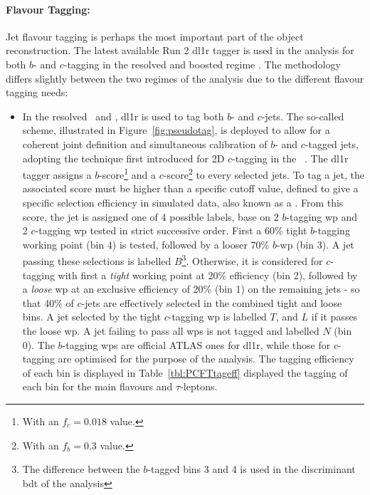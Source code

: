 \paragraph{Flavour Tagging:} Jet flavour tagging is perhaps the most important part of the object reconstruction. The latest available Run 2 \gls{dl1r} tagger is used in the analysis for both $b$- and $c$-tagging in the resolved and boosted regime \cite{atlas:FTAGRUN2}. The methodology differs slightly between the two regimes of the analysis due to the different flavour tagging needs:  %
\begin{itemize}
  \item In the resolved \vhb\ and \vhc, \gls{dl1r} is used to tag both $b$- and $c$-jets. The so-called  scheme, illustrated in Figure~\ref{fig:pseudotag}, is deployed to allow for a coherent joint definition and simultaneous calibration of $b$- and $c$-tagged jets, adopting the technique first introduced for 2D $c$-tagging in the \vhc\ \cite{Collaboration:2721696}. The \gls{dl1r} tagger assigns a $b$-score\footnote{With an $f_c = 0.018$ value.} and a $c$-score\footnote{With an $f_b = 0.3$ value.} to every selected jets. To tag a jet, the associated score must be higher than a specific cutoff value, defined to give a specific selection efficiency in simulated data, also known as a . From this score, the jet is assigned one of 4 possible labels, base on 2 $b$-tagging \gls{wp} and 2 $c$-tagging \gls{wp} tested in strict successive order. First a 60\% tight $b$-tagging working point (bin 4) is tested, followed by a looser 70\% $b$-\gls{wp} (bin 3). A jet passing these selections is labelled $B$\footnote{The difference between the $b$-tagged bins 3 and 4 is used in the discriminant \gls{bdt} of the analysis}. Otherwise, it is considered for $c$-tagging with first a \textit{tight} working point at 20\% efficiency (bin 2), followed by a \textit{loose} \gls{wp} at an exclusive efficiency of 20\% (bin 1) on the remaining jets - so that 40\% of $c$-jets are effectively selected in the combined tight and loose bins. A jet selected by the tight $c$-tagging \gls{wp} is labelled $T$, and $L$ if it passes the loose \gls{wp}. A jet failing to pass all \gls{wp}s is not tagged and labelled $N$ (bin 0). The $b$-tagging \gls{wp}s are official ATLAS ones for \gls{dl1r}, while those for $c$-tagging are optimised for the purpose of the analysis. The tagging efficiency of each bin is displayed in Table~\ref{tbl:PCFTtageff} displayed the tagging of each bin for the main flavours and $\tau$-leptons.

\end{itemize}
